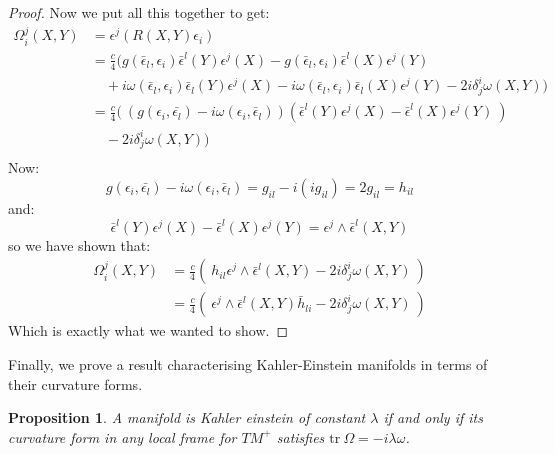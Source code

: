 \documentclass[11pt]{amsart}
\newtheorem{prop}[subsection]{Proposition}
\theoremstyle{definition}
\def \tr{ \text{tr} }
\begin{document}
\begin{proof}
Now we put all this together to get:
%
\begin{align*}
\Omega^j_i (X,Y) &= \epsilon^j ( R(X,Y) \epsilon_i ) \\
%
&= \frac{c}{4} (g( \bar{ \epsilon }_l, \epsilon_i ) \bar{ \epsilon }^l (Y) \epsilon^j(X) - g( \bar{\epsilon}_l, \epsilon_i ) \bar{ \epsilon }^l (X) \epsilon^j (Y) \\
& \quad + i \omega( \bar{ \epsilon }_l, \epsilon_i ) \bar{ \epsilon }_l (Y) \epsilon^j (X) - i \omega( \bar{ \epsilon }_l, \epsilon_i ) \bar{ \epsilon }_l (X) \epsilon^j (Y) - 2 i \delta^i_j \omega( X, Y )) \\
%
&= \frac{c}{4}( \ ( g( \epsilon_i, \bar{ \epsilon_l } ) - i \omega( \epsilon_i, \bar{ \epsilon }_l ) )( \bar{ \epsilon }^l (Y) \epsilon^j (X) - \bar{ \epsilon }^l (X) \epsilon^j (Y) \ ) \\
& \quad - 2 i \delta^i_j \omega( X, Y )) \\
\end{align*}
%
Now:
%
$$ g( \epsilon_i, \bar{ \epsilon_l } ) - i \omega( \epsilon_i, \bar{ \epsilon }_l ) = g_{il} - i( i g_{il} ) = 2 g_{il} = h_{il} $$
%
and:
%
$$ \bar{ \epsilon }^l (Y) \epsilon^j (X) - \bar{ \epsilon }^l (X) \epsilon^j (Y) = \epsilon^j \wedge \bar{ \epsilon }^l (X,Y) $$
%
so we have shown that:
%
\begin{align*}
\Omega^j_i (X,Y) &= \frac{c}{4} ( \ h_{il} \epsilon^j \wedge \bar{ \epsilon }^l (X,Y) - 2 i \delta^i_j \omega( X, Y ) \ ) \\
&= \frac{c}{4} ( \ \epsilon^j \wedge \bar{ \epsilon }^l (X,Y) \bar{h}_{li} - 2 i \delta^i_j \omega( X, Y ) \ )
\end{align*}
%
Which is exactly what we wanted to show.
%
\end{proof}

Finally, we prove a result characterising Kahler-Einstein manifolds in terms of their curvature forms.

\begin{prop}
A manifold is Kahler einstein of constant $\lambda$ if and only if its curvature form in any local frame for $TM^{+}$ satisfies $ \tr \ \Omega =  - i \lambda \omega $.
\end{prop}
\end{document}
